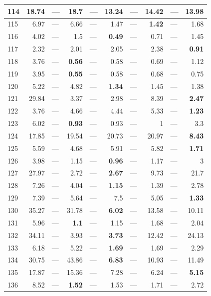 \begin{longtable}{lr@{\hskip 4pt}l@{\hskip 12pt}r@{\hskip 4pt}l@{\hskip 12pt}r@{\hskip 4pt}l@{\hskip 12pt}r@{\hskip 4pt}l@{\hskip 12pt}r}
114 & 18.74 & --- & 18.7 & --- & \textbf{13.24} & --- & 14.42 & --- & 13.98 \\
\midrule
115 & 6.97 & --- & 6.66 & --- & 1.47 & --- & \textbf{1.42} & --- & 1.68 \\
116 & 4.02 & --- & 1.5 & --- & \textbf{0.49} & --- & 0.71 & --- & 1.45 \\
117 & 2.32 & --- & 2.01 & --- & 2.05 & --- & 2.38 & --- & \textbf{0.91} \\
118 & 3.76 & --- & \textbf{0.56} & --- & 0.58 & --- & 0.69 & --- & 1.12 \\
119 & 3.95 & --- & \textbf{0.55} & --- & 0.58 & --- & 0.68 & --- & 0.75 \\
120 & 5.22 & --- & 4.82 & --- & \textbf{1.34} & --- & 1.45 & --- & 1.38 \\
121 & 29.84 & --- & 3.37 & --- & 2.98 & --- & 8.39 & --- & \textbf{2.47} \\
122 & 3.76 & --- & 4.66 & --- & 4.44 & --- & 5.33 & --- & \textbf{1.23} \\
123 & 6.02 & --- & \textbf{0.93} & --- & 0.93 & --- & 1 & --- & 3.3 \\
124 & 17.85 & --- & 19.54 & --- & 20.73 & --- & 20.97 & --- & \textbf{8.43} \\
125 & 5.59 & --- & 4.68 & --- & 5.91 & --- & 5.82 & --- & \textbf{1.71} \\
126 & 3.98 & --- & 1.15 & --- & \textbf{0.96} & --- & 1.17 & --- & 3 \\
127 & 27.97 & --- & 2.72 & --- & \textbf{2.67} & --- & 9.73 & --- & 21.7 \\
128 & 7.26 & --- & 4.04 & --- & \textbf{1.15} & --- & 1.39 & --- & 2.78 \\
129 & 7.39 & --- & 5.64 & --- & 7.5 & --- & 5.05 & --- & \textbf{1.33} \\
130 & 35.27 & --- & 31.78 & --- & \textbf{6.02} & --- & 13.58 & --- & 10.11 \\
131 & 5.96 & --- & \textbf{1.1} & --- & 1.15 & --- & 1.68 & --- & 2.04 \\
132 & 34.11 & --- & 3.93 & --- & \textbf{3.73} & --- & 12.42 & --- & 24.13 \\
133 & 6.18 & --- & 5.22 & --- & \textbf{1.69} & --- & 1.69 & --- & 2.29 \\
134 & 30.75 & --- & 43.86 & --- & \textbf{6.83} & --- & 10.93 & --- & 11.49 \\
135 & 17.87 & --- & 15.36 & --- & 7.28 & --- & 6.24 & --- & \textbf{5.15} \\
136 & 8.52 & --- & \textbf{1.52} & --- & 1.53 & --- & 1.71 & --- & 2.72 \\

\end{longtable}
